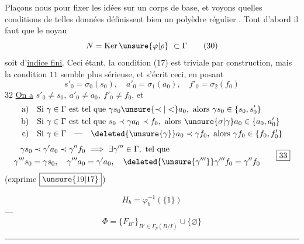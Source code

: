 Plaçons nous pour fixer les idées sur un corps de base, et voyons  quelles conditions de telles données définissent bien un polyèdre régulier . Tout d'abord il faut que le noyau
\[
 N=\mathrm{Ker}\,\unsure{\varphi|\rho}\ \subset\Gamma\tag*{(30)}
\]
soit d'\uline{indice fini}. Ceci étant, la condition  (17) est triviale par construction, mais la condition $\boxed{11}$ semble plus sérieuse, et s'écrit ceci, en posant
\[
 s'_0=\sigma_0(s_0),\quad a'_0=\sigma_1(a_0),\quad f'_0=\sigma_2(f_0)\tag*{(31)}
\]
$\boxed{32}$ \uline{On a} $s'_0\ne s_0,\ a'_0\ne a_0,\ f'_0\ne f_0$, et
\[
 \begin{aligned}
 \text{a)}\quad&\text{Si }\gamma\in\Gamma\text{ est tel que }\gamma s_0\unsure{\prec|<}a_0,\ \text{alors }\gamma s_0\in\{s_0,s'_0\}\\
 \text{b)}\quad&\text{Si }\gamma\in\Gamma\text{ est tel que }s_0\prec\gamma a_0\prec f_0,\ \text{alors }\unsure{\sigma|\gamma}a_0\in\{a_0,a'_0\}\\
 \text{c)}\quad&\text{Si }\gamma\in\Gamma\quad\text{---}\quad\deleted{\unsure{\gamma}}a_0\prec\gamma f_0,\ \text{alors }\gamma f_0\in\{f_0,f'_0\}
 \end{aligned}
\]
\[
 \begin{aligned}
 \gamma s_0\prec\gamma'a_0\prec\gamma''f_0&\ \Longrightarrow\ \exists\gamma'''\in\Gamma,\ \text{tel que}\\
 \gamma'''s_0=\gamma s_0,\quad\gamma'''a_0&=\gamma'a_0,\quad\deleted{\unsure{\gamma'''}}\gamma'''f_0=\gamma''f_0
 \end{aligned}\tag*{\boxed{33}}
\]
(exprime $\boxed{\unsure{19|17}}$)


\[
 H_b=\varphi_b^{-1}(\{1\})
\]
---
\[
 \Phi=\{F_{B'}\}_{B'\in\Gamma_p(B/I)}\cup\{\varnothing\}
\]
\noindent\rule{\linewidth}{0.4pt}

